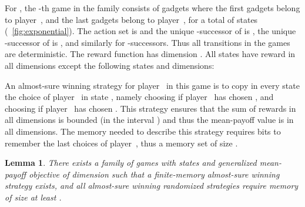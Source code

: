 \documentclass{article}
\newtheorem{lemma}{Lemma}
\begin{document}
\smallskip{}
For , the -th game in the family consists of  gadgets where
the first  gadgets belong to player~, and the last  gadgets belong to 
player~, for a total of  states (\figurename~\ref{fig:exponential}). 
The action set is  and the unique -successor of  is ,
the unique -successor of  is , and similarly for -successors.
Thus all transitions in the games are deterministic.
The reward function has dimension . All states have reward  in all dimensions 
except the following states and dimensions:
\begin{compactitem}
\item[] 
\item[] 
\end{compactitem}
An almost-sure winning strategy for player~ in this game is to copy in 
every state  the choice of player~ in state , namely choosing 
 if player~ has chosen , and choosing  if player~ 
has chosen . This strategy ensures that the sum of rewards in all 
dimensions is bounded (in the interval ) and thus the mean-payoff value
is  in all dimensions. The memory needed to describe this strategy requires
 bits to remember the last  choices of player~, thus a memory set of 
size .

\begin{lemma}\label{lem:exponential}
There exists a family of games  with  states and generalized mean-payoff
objective of dimension  such that a finite-memory almost-sure winning strategy exists,
and all almost-sure winning randomized strategies require memory of size at least .
\end{lemma}
\end{document}
